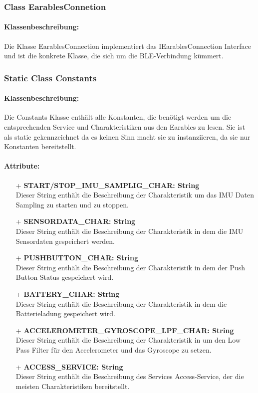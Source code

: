 \documentclass[a4paper,12pt]{article}
\begin{document}
\subsubsection{Class EarablesConnetion}

\paragraph{Klassenbeschreibung:}
Die Klasse EarablesConnection implementiert das IEarablesConnection Interface und ist die konkrete Klasse, die sich um die BLE-Verbindung kümmert.


\subsubsection{Static Class Constants}
\paragraph{Klassenbeschreibung:}
Die Constants Klasse enthält alle Konstanten, die benötigt werden um die entsprechenden Service und Charakteristiken aus den \Gls{Earables} zu lesen. Sie ist als static gekennzeichnet da es keinen Sinn macht sie zu instanziieren, da sie nur Konstanten bereitstellt.

\paragraph{Attribute:}
\begin{itemize}
	\item[+] \textbf{START/STOP\_IMU\_SAMPLIG\_CHAR: String}\\Dieser String enthält die Beschreibung der Charakteristik um das IMU Daten Sampling zu starten und zu stoppen.
	\item[+] \textbf{SENSORDATA\_CHAR: String}\\Dieser String enthält die Beschreibung der Charakteristik in dem die IMU Sensordaten gespeichert werden.
	\item[+] \textbf{PUSHBUTTON\_CHAR: String}\\Dieser String enthält die Beschreibung der Charakteristik in dem der Push Button Status gespeichert wird.
	\item[+] \textbf{BATTERY\_CHAR: String}\\Dieser String enthält die Beschreibung der Charakteristik in dem die Batterieladung gespeichert wird.
	\item[+] \textbf{ACCELEROMETER\_GYROSCOPE\_LPF\_CHAR: String}\\Dieser String enthält die Beschreibung der Charakteristik in um den Low Pass Filter für den Accelerometer und das Gyroscope zu setzen.
\item[+] \textbf{ACCESS\_SERVICE: String}\\Dieser String enthält die Beschreibung des Services Access-Service, der die meisten Charakteristiken bereitstellt.
\end{itemize}
\end{document}
